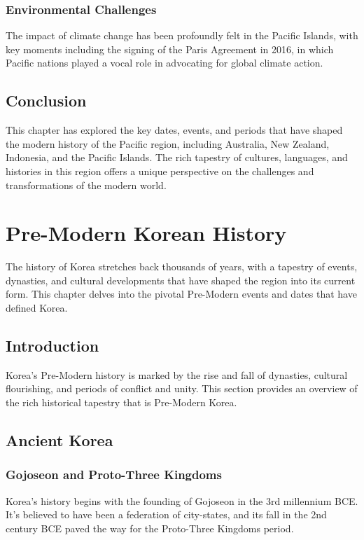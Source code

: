 \documentclass[a4paper,12pt]{book}
\begin{document}
\subsection{Environmental Challenges}
\label{subsec:environmental-challenges}
The impact of climate change has been profoundly felt in the Pacific Islands, with key moments including the signing of the Paris Agreement in 2016, in which Pacific nations played a vocal role in advocating for global climate action.

\section{Conclusion}
\label{sec:conclusion-modern-pacific}
This chapter has explored the key dates, events, and periods that have shaped the modern history of the Pacific region, including Australia, New Zealand, Indonesia, and the Pacific Islands. The rich tapestry of cultures, languages, and histories in this region offers a unique perspective on the challenges and transformations of the modern world.

\chapter{Pre-Modern Korean History}
\label{ch:pre-modern-korean-history}

The history of Korea stretches back thousands of years, with a tapestry of events, dynasties, and cultural developments that have shaped the region into its current form. This chapter delves into the pivotal Pre-Modern events and dates that have defined Korea.

\section{Introduction}
\label{sec:introduction-pre-modern-korea}
Korea’s Pre-Modern history is marked by the rise and fall of dynasties, cultural flourishing, and periods of conflict and unity. This section provides an overview of the rich historical tapestry that is Pre-Modern Korea.

\section{Ancient Korea}
\label{sec:ancient-korea}

\subsection{Gojoseon and Proto-Three Kingdoms}
\label{subsec:gojoseon-proto-three-kingdoms}
Korea’s history begins with the founding of Gojoseon in the 3rd millennium BCE. It’s believed to have been a federation of city-states, and its fall in the 2nd century BCE paved the way for the Proto-Three Kingdoms period.
\end{document}

